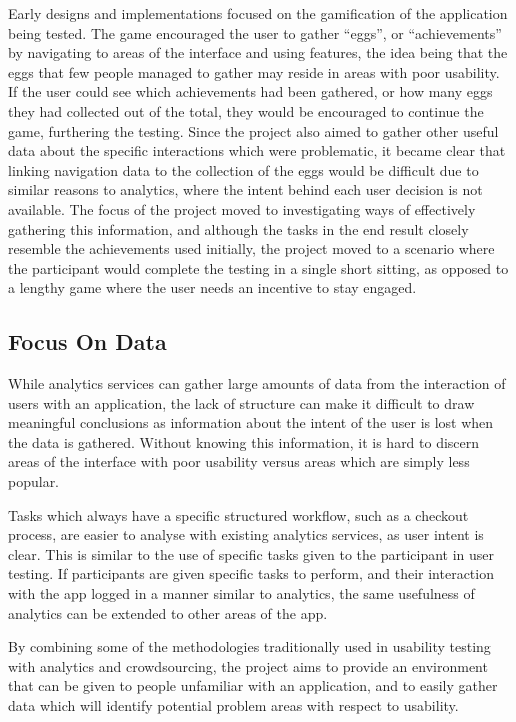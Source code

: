 Early designs and implementations focused on the gamification of the application
being tested. The game encouraged the user to gather ``eggs'', or ``achievements''
by navigating to areas of the interface and using features, the idea being that
the eggs that few people managed to gather may reside in areas with poor usability.
If the user could see which achievements had been gathered, or how many eggs
they had collected out of the total, they would be encouraged to continue the
game, furthering the testing.
Since the project also aimed to gather other useful data about the specific
interactions which were problematic, it became clear that linking navigation
data to the collection of the eggs would be difficult due to similar reasons
to analytics, where the intent behind each user decision is not available.
The focus of the project moved to investigating ways of effectively gathering
this information, and although the tasks in the end result closely resemble
the achievements used initially, the project moved to a scenario where the
participant would complete the testing in a single short sitting, as opposed
to a lengthy game where the user needs an incentive to stay engaged.

\subsection{Focus On Data}

While analytics services can gather large amounts of data from the interaction
of users with an application, the lack of structure can make it difficult to
draw meaningful conclusions as information about the intent of the user is lost
when the data is gathered.  Without knowing this information, it is hard to
discern areas of the interface with poor usability versus areas which are
simply less popular.

Tasks which always have a specific structured workflow, such as a checkout
process, are easier to analyse with existing analytics services, as user intent
is clear. This is similar to the use of specific tasks given to the participant
in user testing. If participants are given specific tasks to perform, and their
interaction with the app logged in a manner similar to analytics, the same
usefulness of analytics can be extended to other areas of the app.

By combining some of the methodologies traditionally used in usability testing
with analytics and crowdsourcing, the project aims to provide an environment
that can be given to people unfamiliar with an application, and to easily
gather data which will identify potential problem areas with respect to
usability.


